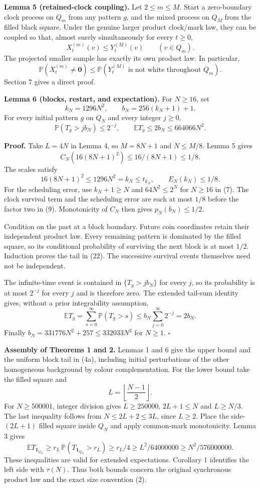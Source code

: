 \documentclass[
  11pt,
  a4paper,
]{article}
\begin{document}
\textbf{Lemma 5 (retained-clock coupling).} Let \(2\leq m\leq M\). Start
a zero-boundary clock process on \(Q_m\) from any pattern \(g\), and the
mixed process on \(Q_M\) from the filled black square. Under the genuine
larger product clock/mark law, they can be coupled so that, almost
surely simultaneously for every \(t\geq0\), \[
X^{(m)}_t(v)\leq Y^{(M)}_t(v)\qquad(v\in Q_m).
\tag{19}
\] The projected smaller sample has exactly its own product law. In
particular, \[
\mathbb P(X^{(m)}_t\ne\mathbf0)
\leq\mathbb P(Y^{(M)}_t\text{ is not white throughout }Q_m).
\tag{20}
\] Section 7 gives a direct proof.

\textbf{Lemma 6 (blocks, restart, and expectation).} For \(N\geq16\),
set \[
k_N=1296N^2,\qquad b_N=256(k_N+1)+1.
\tag{21}
\] For every initial pattern \(g\) on \(Q_N\) and every integer
\(j\geq0\), \[
\mathbb P(T_g>jb_N)\leq2^{-j},\qquad
\mathbb E T_g\leq2b_N\leq664066N^2.
\tag{22}
\]

\textbf{Proof.} Take \(L=4N\) in Lemma 4, so \(M=8N+1\) and
\(N\leq M/8\). Lemma 5 gives \[
C_N(16(8N+1)^2)\leq16/(8N+1)\leq1/8.
\] The scales satisfy \[
16(8N+1)^2\leq1296N^2=k_N\leq t_{k_N},
\qquad E_N(k_N)\leq1/8.
\] For the scheduling error, use \(k_N+1\geq N\) and \(64N^2\leq2^N\)
for \(N\geq16\) in (7). The clock survival term and the scheduling error
are each at most \(1/8\) before the factor two in (9). Monotonicity of
\(C_N\) then gives \(p_N(b_N)\leq1/2\).

Condition on the past at a block boundary. Future coin coordinates
retain their independent product law. Every remaining pattern is
dominated by the filled square, so its conditional probability of
surviving the next block is at most \(1/2\). Induction proves the tail
in (22). The successive survival events themselves need not be
independent.

The infinite-time event is contained in \(\{T_g>jb_N\}\) for every
\(j\), so its probability is at most \(2^{-j}\) for every \(j\) and is
therefore zero. The extended tail-sum identity gives, without a prior
integrability assumption, \[
\mathbb E T_g=\sum_{s=0}^{\infty}\mathbb P(T_g>s)
\leq b_N\sum_{j=0}^{\infty}2^{-j}=2b_N.
\] Finally \(b_N=331776N^2+257\leq332033N^2\) for \(N\geq1\).
\(\square\)

\textbf{Assembly of Theorems 1 and 2.} Lemmas 1 and 6 give the upper
bound and the uniform block tail in (4a), including initial
perturbations of the other homogeneous background by colour
complementation. For the lower bound take the filled square and \[
L=\left\lfloor\frac{N-1}{2}\right\rfloor.
\] For \(N\geq500001\), integer division gives \(L\geq250000\),
\(2L+1\leq N\) and \(L\geq N/3\). The last inequality follows from
\(N\leq2L+2\leq3L\), since \(L\geq2\). Place the side-\((2L+1)\) filled
square inside \(Q_N\) and apply common-mark monotonicity. Lemma 3 gives
\[
\mathbb E T_{\mathbf1_{Q_N}}
\geq r_L\,\mathbb P(T_{\mathbf1_{Q_N}}>r_L)
\geq r_L/4
\geq L^2/64000000
\geq N^2/576000000.
\] These inequalities are valid for extended expectations. Corollary 1
identifies the left side with \(\tau(N)\). Thus both bounds concern the
original synchronous product law and the exact size convention (2).
\end{document}
